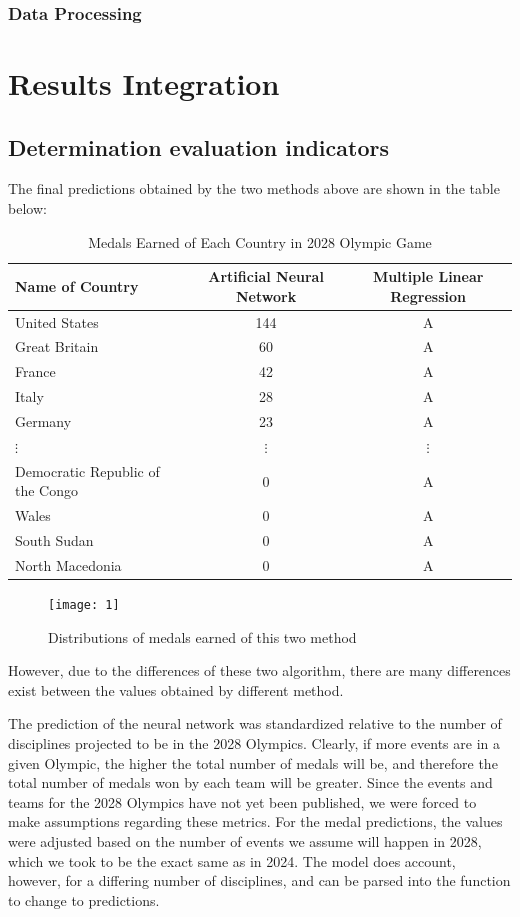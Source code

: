 \documentclass{mcmthesis}
\begin{document}
\subsubsection{Data Processing}

\section{Results Integration}\label{RestultsIntegration}
\subsection{Determination evaluation indicators}
The final predictions obtained by the two methods above are shown in the table below:
\begin{table}[H]
\centering 
\label{A}
 \caption{Medals Earned of Each Country in 2028 Olympic Game}
\vspace{5pt}
\begin{tabular}{lcc}
\hline
\textbf{Name of Country} & \textbf{Artificial Neural Network} & \textbf{Multiple Linear Regression} \\
\hline\hline
United States & 144 & A\\
Great Britain & 60 & A\\
France & 42 & A\\
Italy & 28 & A\\
Germany & 23 & A\\ 
$\vdots$ & $\vdots$ & $\vdots$\\ 
Democratic Republic of the Congo & 0 & A\\
Wales & 0 & A\\
South Sudan & 0 & A\\
North Macedonia & 0 & A\\ 
\hline
\end{tabular}
\end{table}
\begin{figure}[h]
  \centering
  \texttt{[image: 1]} %
  \caption{Distributions of medals earned of this two method }
  \label{exampleId}
\end{figure}
However, due to the differences of these two algorithm, there are many differences exist between the values obtained by different method. 

The prediction of the neural network was standardized relative to the number of disciplines projected to be in the 2028 Olympics. Clearly, if more events are in a given Olympic, the higher the total number of medals will be, and therefore the total number of medals won by each team will be greater. Since the events and teams for the 2028 Olympics have not yet been published, we were forced to make assumptions regarding these metrics. For the medal predictions, the values were adjusted based on the number of events we assume will happen in 2028, which we took to be the exact same as in 2024. The model does account, however, for a differing number of disciplines, and can be parsed into the function to change to predictions.
\end{document}
